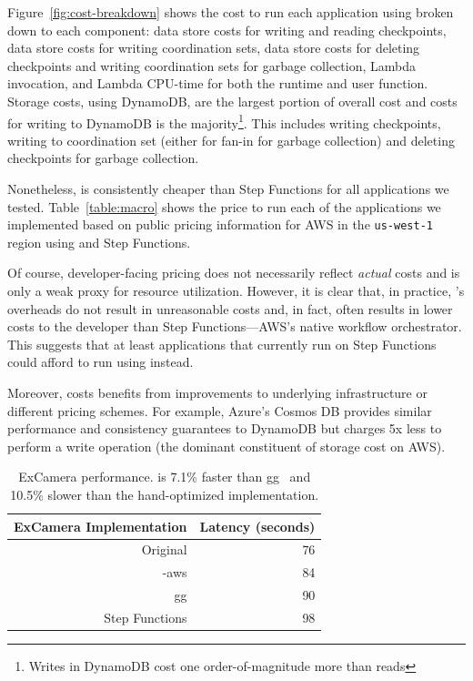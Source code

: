 Figure~\ref{fig:cost-breakdown} shows the cost to run each application using
\name{} broken down to each component: data store costs for writing and
reading checkpoints, data store costs for writing coordination sets, data
store costs for deleting checkpoints and writing coordination sets for garbage
collection, Lambda invocation, and Lambda CPU-time for both the \name{}
runtime and user function. Storage costs, using DynamoDB, are the largest
portion of overall cost and costs for writing to DynamoDB is the
majority\footnote{Writes in DynamoDB cost one order-of-magnitude more than
reads}. This includes writing checkpoints, writing to coordination set (either
for fan-in for garbage collection) and deleting checkpoints for garbage
collection.

Nonetheless, \name{} is consistently cheaper than Step Functions for all
applications we tested. Table~\ref{table:macro} shows the price to run each of
the applications we implemented based on public pricing information for AWS in
the \texttt{us-west-1} region using \name{} and Step Functions.


Of course, developer-facing pricing does not necessarily reflect \emph{actual}
costs and is only a weak proxy for resource utilization. However, it is clear
that, in practice, \name{}'s overheads do not result in unreasonable costs and,
in fact, often results in lower costs to the developer than Step
Functions---AWS's native workflow orchestrator. This suggests that at least
applications that currently run on Step Functions could afford to run using
\name{} instead.

Moreover, \name{} costs benefits from improvements to underlying infrastructure
or different pricing schemes. For example, Azure's Cosmos DB provides similar
performance and consistency guarantees to DynamoDB but charges 5x less to
perform a write operation (the dominant constituent of \name{} storage cost on
AWS).



\begin{table}
  \centering
  \begin{tabular}{|r|r|}
    \hline
    \textbf{ExCamera Implementation} & \textbf{Latency (seconds)} \\ \hline
    Original        & 76                         \\ \hline
    \name{}-aws & 84                         \\ \hline
    gg                       & 90                         \\ \hline
    Step Functions & 98                         \\ \hline
  \end{tabular}
  \caption{ExCamera performance. \name{} is 7.1\% faster than
gg~\cite{gg-atc} and 10.5\% slower than the hand-optimized implementation.}
  \label{table:excamera}
\end{table}

